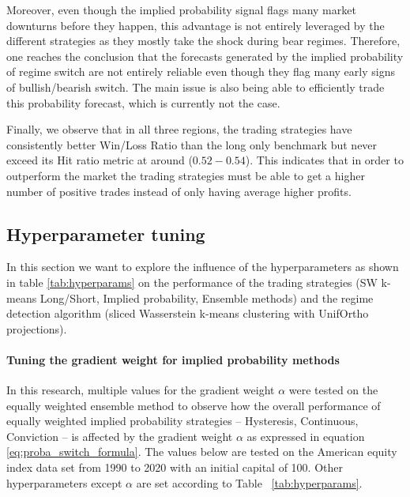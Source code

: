 \documentclass[12pt,a4paper]{report}
\begin{document}
Moreover, even though the implied probability signal flags many market downturns before they happen, this advantage is not entirely leveraged by the different strategies as they mostly take the shock during bear regimes.  
Therefore, one reaches the conclusion that the forecasts generated by the implied probability of regime switch are not entirely reliable even though they flag many early signs of bullish/bearish switch.
The main issue is also being able to efficiently trade this probability forecast, which is currently not the case.

Finally, we observe that in all three regions, the trading strategies have consistently better Win/Loss Ratio than the long only benchmark but never exceed its Hit ratio metric at around ($0.52 - 0.54$). 
This indicates that in order to outperform the market the trading strategies must be able to get a higher number of positive trades instead of only having average higher profits.


\subsection{Hyperparameter tuning}
In this section we want to explore the influence of the hyperparameters as shown in table \ref{tab:hyperparams} on the performance of the trading strategies
(SW k-means Long/Short, Implied probability, Ensemble methods) and the regime detection algorithm (sliced Wasserstein k-means clustering with UnifOrtho projections).

\paragraph{Tuning the gradient weight for implied probability methods}
In this research, multiple values for the gradient weight $\alpha$ were tested on the equally weighted ensemble method to observe how the overall performance of equally weighted implied probability 
strategies -- Hysteresis, Continuous, Conviction -- is affected by the gradient weight $\alpha$ as expressed in equation \ref{eq:proba_switch_formula}.
The values below are tested on the American equity index data set from 1990 to 2020 with an initial capital of 100.  
Other hyperparameters except $\alpha$ are set according to Table ~\ref{tab:hyperparams}.
\end{document}
